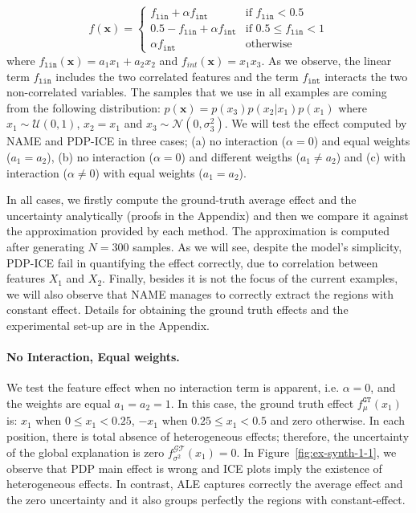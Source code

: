 \documentclass[twoside]{article}
\begin{document}
\begin{equation}
  \label{eq:synth-ex-1-function}
  f(\mathbf{x}) = \begin{cases}
                    f_{\mathtt{lin}} + \alpha f_{\mathtt{int}} & \text{if $f_{\mathtt{lin}} < 0.5$ }\\
                    0.5 - f_{\mathtt{lin}} + \alpha f_{\mathtt{int}} & \text{if $0.5 \leq f_{\mathtt{lin}} < 1$}\\
                    \alpha f_{\mathtt{int}} &\text{otherwise}
                  \end{cases}
\end{equation}
%
where \(f_{\mathtt{lin}}(\mathbf{x}) = a_1 x_1 + a_2 x_2\) and
\(f_{int}(\mathbf{x}) = x_1x_3\). As we observe, the linear term
\(f_{\mathtt{lin}}\) includes the two correlated features and the term
\(f_{\mathtt{int}}\) interacts the two non-correlated variables. The
samples that we use in all examples are coming from the following
distribution: \(p(\mathbf{x}) = p(x_3)p(x_2|x_1)p(x_1)\) where
\(x_1 \sim \mathcal{U}(0,1)\), \(x_2 = x_1\) and
\(x_3 \sim \mathcal{N}(0, \sigma_3^2)\). We will test the effect
computed by NAME and PDP-ICE in three cases; (a) no interaction
(\(\alpha=0\)) and equal weights (\(a_1=a_2\)), (b) no interaction
(\(\alpha=0\)) and different weigths (\( a_1 \neq a_2 \)) and (c) with
interaction (\(\alpha \neq 0\)) with equal weights (\(a_1=a_2\)).

In all cases, we firstly compute the ground-truth average effect and
the uncertainty analytically (proofs in the Appendix) and then we
compare it against the approximation provided by each method. The
approximation is computed after generating \(N=300\) samples. As we
will see, despite the model's simplicity, PDP-ICE fail in quantifying
the effect correctly, due to correlation between features \(X_1\) and
\(X_2\). Finally, besides it is not the focus of the current examples,
we will also observe that NAME manages to correctly extract the
regions with constant effect. Details for obtaining the ground truth
effects and the experimental set-up are in the Appendix.

\paragraph{No Interaction, Equal weights.}

We test the feature effect when no interaction term is apparent,
i.e. \(\alpha=0\), and the weights are equal \(a_1=a_2=1\).  In this
case, the ground truth effect \(f_\mu^{\mathtt{GT}}(x_1)\) is: \(x_1\)
when \(0 \leq x_1 < 0.25\), \(-x_1\) when \(0.25 \leq x_1 < 0.5\) and
zero otherwise. In each position, there is total absence of
heterogeneous effects; therefore, the uncertainty of the global
explanation is zero \(f^{\mathcal{GT}}_{\sigma^2}(x_1) = 0\). In
Figure~\ref{fig:ex-synth-1-1}, we observe that PDP main effect is
wrong and ICE plots imply the existence of heterogeneous effects. In
contrast, ALE captures correctly the average effect and the zero
uncertainty and it also groups perfectly the regions with
constant-effect.
\end{document}
